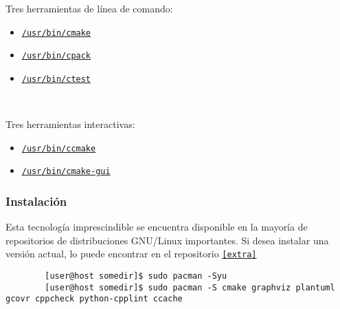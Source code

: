 \begin{frame}[fragile]
	Tres herramientas de línea de comando:

	\begin{itemize}
		\item
		
		\href{https://man.archlinux.org/man/cmake.1}{\lstinline{/usr/bin/cmake}}

		\item
		
		\href{https://man.archlinux.org/man/cpack.1}{\lstinline{/usr/bin/cpack}}

		\item
		
		\href{https://man.archlinux.org/man/ctest.1}{\lstinline{/usr/bin/ctest}}
	\end{itemize}

	\

	Tres herramientas interactivas:

	\begin{itemize}
		\item
		
		\href{https://man.archlinux.org/man/ccmake.1}{\lstinline{/usr/bin/ccmake}}

		\item
		
		\href{https://man.archlinux.org/man/cmake-gui.1}{\lstinline{/usr/bin/cmake-gui}}
	\end{itemize}
\end{frame}

\begin{frame}[fragile]
	\frametitle{Instalación}
	Esta tecnología imprescindible se encuentra disponible en la
	mayoría de repositorios de distribuciones GNU/Linux importantes.
	Si desea instalar una versión actual, lo puede encontrar en el
	repositorio \href{https://archlinux.org/packages/extra/x86_64/cmake}{\lstinline{[extra]}}

	\begin{verbatim}
		[user@host somedir]$ sudo pacman -Syu
		[user@host somedir]$ sudo pacman -S cmake graphviz plantuml gcovr cppcheck python-cpplint ccache
	\end{verbatim}
\end{frame}


